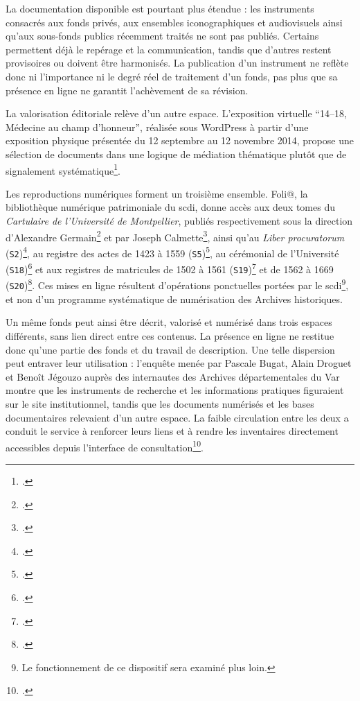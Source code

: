 La documentation disponible est pourtant plus étendue : les instruments consacrés aux fonds privés, aux ensembles iconographiques et audiovisuels ainsi qu'aux sous-fonds publics récemment traités ne sont pas publiés. Certains permettent déjà le repérage et la communication, tandis que d'autres restent provisoires ou doivent être harmonisés. La publication d'un instrument ne reflète donc ni l'importance ni le degré réel de traitement d'un fonds, pas plus que sa présence en ligne ne garantit l'achèvement de sa révision.

La valorisation éditoriale relève d'un autre espace. L'exposition virtuelle \enquote{14--18, Médecine au champ d'honneur}, réalisée sous WordPress à partir d'une exposition physique présentée du 12 septembre au 12 novembre 2014, propose une sélection de documents dans une logique de médiation thématique plutôt que de \gls{signalement} systématique\footcite{UMExpositionMedecine1418}.

Les reproductions numériques forment un troisième ensemble. Foli@, la bibliothèque numérique patrimoniale du \gls{scdi}, donne accès aux deux tomes du \emph{Cartulaire de l'Université de Montpellier}, publiés respectivement sous la direction d'Alexandre Germain\footcite{GermainUniversite1890} et par Joseph Calmette\footcite{CalmetteCartulaire1912}, ainsi qu'au \emph{Liber procuratorum} (\texttt{S2})\footcite{AHFMS2}, au registre des actes de 1423 à 1559 (\texttt{S5})\footcite{AHFMS5}, au cérémonial de l'Université (\texttt{S18})\footcite{AHFMS18} et aux registres de matricules de 1502 à 1561 (\texttt{S19})\footcite{AHFMS19} et de 1562 à 1669 (\texttt{S20})\footcite{AHFMS20}. Ces mises en ligne résultent d'opérations ponctuelles portées par le \gls{scdi}\footnote{Le fonctionnement de ce dispositif sera examiné plus loin.}, et non d'un programme systématique de numérisation des Archives historiques.

Un même fonds peut ainsi être décrit, valorisé et numérisé dans trois espaces différents, sans lien direct entre ces contenus. La présence en ligne ne restitue donc qu'une partie des fonds et du travail de description. Une telle dispersion peut entraver leur utilisation : l'enquête menée par Pascale Bugat, Alain Droguet et Benoît Jégouzo auprès des internautes des Archives départementales du Var montre que les instruments de recherche et les informations pratiques figuraient sur le site institutionnel, tandis que les documents numérisés et les bases documentaires relevaient d'un autre espace. La faible circulation entre les deux a conduit le service à renforcer leurs liens et à rendre les inventaires directement accessibles depuis l'interface de consultation\footcite[pp.~154--157]{BugatDroguetJegouzo2007}.

